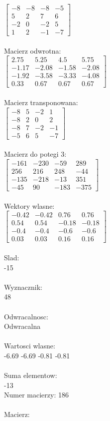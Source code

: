 \documentclass[a4paper,12pt]{article}
\begin{document}
$\begin{bmatrix} -8&-8&-8&-5\\5&2&7&6\\-2&0&-2&5\\1&2&-1&-7 \end{bmatrix}$
\\
\\
Macierz odwrotna:\\

$\begin{bmatrix} 2.75&5.25&4.5&5.75\\-1.17&-2.08&-1.58&-2.08\\-1.92&-3.58&-3.33&-4.08\\0.33&0.67&0.67&0.67 \end{bmatrix}$
\\
\\
Macierz transponowana:\\

$\begin{bmatrix} -8&5&-2&1\\-8&2&0&2\\-8&7&-2&-1\\-5&6&5&-7 \end{bmatrix}$
\\
\\
Macierz do potegi 3:\\

$\begin{bmatrix} -161&-230&-59&289\\256&216&248&-44\\-135&-218&-13&351\\-45&90&-183&-375 \end{bmatrix}$
\\
\\
Wektory wlasne:\\

$\begin{bmatrix} -0.42&-0.42&0.76&0.76\\0.54&0.54&-0.18&-0.18\\-0.4&-0.4&-0.6&-0.6\\0.03&0.03&0.16&0.16 \end{bmatrix}$
\\
\\
Slad:\\
-15
\\
\\
Wyznacznik:\\
48
\\
\\
Odwracalnosc:\\
Odwracalna
\\
\\
Wartosci wlasne:\\
-6.69 -6.69 -0.81 -0.81
\\
\\
Suma elementow:\\
-13
\\
\newpage
Numer macierzy:
186
\\
\\
Macierz:\\
\end{document}
